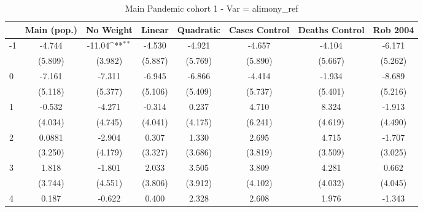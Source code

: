 \documentclass{article}
\begin{document}
{
\def\sym#1{\ifmmode^{#1}\else\(^{#1}\)\fi}
\begin{longtable}{l*{7}{c}}
\caption{Main Pandemic cohort 1 - Var = alimony\_ref}\\
\hline\hline\endfirsthead\hline\endhead\hline\endfoot\endlastfoot
                &\multicolumn{1}{c}{Main (pop.)}&\multicolumn{1}{c}{No Weight}&\multicolumn{1}{c}{Linear}&\multicolumn{1}{c}{Quadratic}&\multicolumn{1}{c}{Cases Control}&\multicolumn{1}{c}{Deaths Control}&\multicolumn{1}{c}{Rob 2004}\\
\hline
-1              &   -4.744         &   -11.04\sym{**} &   -4.530         &   -4.921         &   -4.657         &   -4.104         &   -6.171         \\
                &  (5.809)         &  (3.982)         &  (5.887)         &  (5.769)         &  (5.890)         &  (5.667)         &  (5.262)         \\
0               &   -7.161         &   -7.311         &   -6.945         &   -6.866         &   -4.414         &   -1.934         &   -8.689         \\
                &  (5.118)         &  (5.377)         &  (5.106)         &  (5.409)         &  (5.737)         &  (5.401)         &  (5.216)         \\
1               &   -0.532         &   -4.271         &   -0.314         &    0.237         &    4.710         &    8.324         &   -1.913         \\
                &  (4.034)         &  (4.745)         &  (4.041)         &  (4.175)         &  (6.241)         &  (4.619)         &  (4.490)         \\
2               &   0.0881         &   -2.904         &    0.307         &    1.330         &    2.695         &    4.715         &   -1.707         \\
                &  (3.250)         &  (4.179)         &  (3.327)         &  (3.686)         &  (3.819)         &  (3.509)         &  (3.025)         \\
3               &    1.818         &   -1.801         &    2.033         &    3.505         &    3.809         &    4.281         &    0.662         \\
                &  (3.744)         &  (4.551)         &  (3.806)         &  (3.912)         &  (4.102)         &  (4.032)         &  (4.045)         \\
4               &    0.187         &   -0.622         &    0.400         &    2.328         &    2.608         &    1.976         &   -1.343         \\

\end{longtable}}
\end{document}

